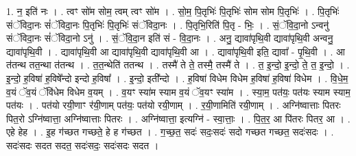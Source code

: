 \documentclass[17pt]{extarticle}
\begin{document}
1. न॒ इति॑ नः । . त्वꣳ सो॑म सोम॒ त्वम् त्वꣳ सो॑म । . सो॒म॒ पि॒तृभिः॑ पि॒तृभिः॑ सोम सोम पि॒तृभिः॑ । . पि॒तृभिः॑ संॅविदा॒नः सं॑ॅविदा॒नः पि॒तृभिः॑ पि॒तृभिः॑ संॅविदा॒नः । . पि॒तृभि॒रिति॑ पि॒तृ - भिः॒ । . सं॒ॅवि॒दा॒नो ऽन्वनु॑ संॅविदा॒नः सं॑ॅविदा॒नो ऽनु॑ । . सं॒ॅवि॒दा॒न इति॑ सं - वि॒दा॒नः । . अनु॒ द्यावा॑पृथि॒वी द्यावा॑पृथि॒वी अन्वनु॒ द्यावा॑पृथि॒वी । . द्यावा॑पृथि॒वी आ द्यावा॑पृथि॒वी द्यावा॑पृथि॒वी आ । . द्यावा॑पृथि॒वी इति॒ द्यावा᳚ - पृ॒थि॒वी । . आ त॑तन्थ तत॒न्था त॑तन्थ । . त॒त॒न्थेति॑ ततन्थ । . तस्मै॑ ते ते॒ तस्मै॒ तस्मै॑ ते । . त॒ इ॒न्दो॒ इ॒न्दो॒ ते॒ त॒ इ॒न्दो॒ । . इ॒न्दो॒ ह॒विषा॑ ह॒विषे᳚न्दो इन्दो ह॒विषा᳚ । . इ॒न्दो॒ इती᳚न्दो । . ह॒विषा॑ विधेम विधेम ह॒विषा॑ ह॒विषा॑ विधेम । . वि॒धे॒म॒ व॒यं ॅव॒यं ॅवि॑धेम विधेम व॒यम् । . व॒यꣳ स्या॑म स्याम व॒यं ॅव॒यꣳ स्या॑म । . स्या॒म॒ पत॑यः॒ पत॑यः स्याम स्याम॒ पत॑यः । . पत॑यो रयी॒णाꣳ र॑यी॒णाम् पत॑यः॒ पत॑यो रयी॒णाम् । . र॒यी॒णामिति॑ रयी॒णाम् । . अग्नि॑ष्वात्ताः पितरः पित॒रो ऽग्नि॑ष्वात्ता॒ अग्नि॑ष्वात्ताः पितरः । . अग्नि॑ष्वात्ता॒ इत्यग्नि॑ - स्वा॒त्ताः॒ । . पि॒त॒र॒ आ पि॑तरः पितर॒ आ । . एहे हेह । . इ॒ह ग॑च्छत गच्छते॒ हे ह ग॑च्छत । . ग॒च्छ॒त॒ सदः॑ सदः॒सदः॑ सदो गच्छत गच्छत॒ सदः॑सदः । . सदः॑सदः सदत सदत॒ सदः॑सदः॒ सदः॑सदः सदत । \newline
\end{document}
